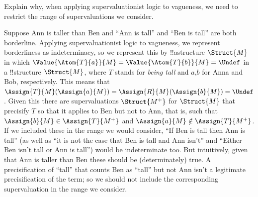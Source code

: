 \documentclass[../../../../include/open-logic-chapter]{subfiles}
\begin{document}
\begin{prob}
	Explain why, when applying supervaluationist logic to vagueness, we need to restrict the range of supervaluations we consider. 
\begin{ans}
	Suppose Ann is taller than Ben and ``Ann is tall'' and ``Ben is tall'' are 
	both borderline. Applying supervaluationist logic to vagueness, we represent
	borderliness as indeterminacy, so we represent this by !!a{structure} 
	$\Struct{M}$ in which $\Value{\Atom{T}{a}}{M}=\Value{\Atom{T}{b}}{M} = \Undef$ 
	in a !!{structure} $\Struct{M}$, where $T$ stands for \emph{being tall} and
	$a$,$b$ for Anna and Bob, respectively. This means that $\Assign{T}{M}(\Assign{a}{M})=\Assign{R}{M}(\Assign{b}{M})=\Undef$. Given this there are supervaluations $\Struct{M^+}$ for $\Struct{M}$ that precisify $T$ so that it applies to Ben but not
	to Ann, that is, such that $\Assign{b}{M}\in\Assign{T}{M^+}$ and $\Assign{a}{M}\notin\Assign{T}{M^+}$. If we included these in the range we would consider, ``If Ben is tall then Ann is tall'' (as well as ``it is not the case that Ben is tall and Ann isn't'' and ``Either Ben isn't tall or Ann is tall'') would be indeterminate
	too. But intuitively, given that Ann is taller than Ben these should be (determinately) true. A precisification of ``tall'' that counts Ben as ``tall'' but
	not Ann isn't a legitimate precisification of the term; so we should not include 
	the corresponding supervaluation in the range we consider.
\end{ans}
\end{prob}

\end{document}
